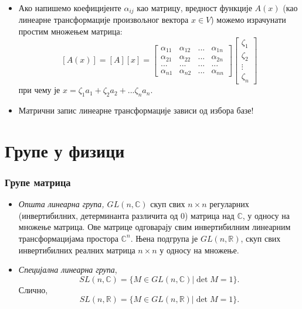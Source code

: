 \documentclass{beamer}
\theoremstyle{plain}
\theoremstyle{definition}
\begin{document}
\begin{frame}
\begin{itemize}
\item Ако напишемо коефицијенте $\alpha_{ij}$ као матрицу, вредност функције $A(x)$ (као линеарне трансформације произвољног вектора $x\in V$) можемо израчунати простим множењем матрица:
$$[A(x)] = [A][x] = \begin{bmatrix}
            \alpha_{11} & \alpha_{12} & ... & \alpha_{1n} \\
            \alpha_{21} & \alpha_{22} & ... & \alpha_{2n} \\
            ... & ... & ... & ... \\
            \alpha_{n1} & \alpha_{n2} & ... & \alpha_{nn}
           \end{bmatrix}
           \begin{bmatrix}
           \zeta_1\\
           \zeta_2\\
           \vdots \\
           \zeta_n
           \end{bmatrix}
$$
при чему је $x = \zeta_1 a_1 + \zeta_2 a_2 + ... \zeta_n a_n$.
\item Матрични запис линеарне трансформације зависи од избора базе!
\end{itemize}
\end{frame}

\section{Групе у физици}
\begin{frame}
\frametitle{Групе матрица}
\begin{itemize}
\item \emph{Општа линеарна група, $GL(n, \mathbb{C})$} скуп свих $n\times n$ регуларних (инвертибилних, детерминанта различита од 0) матрица над $\mathbb{C}$, у односу на множење матрица. Ове матрице одговарају свим инвертибилним линеарним трансформацијама простора $\mathbb{C}^n$. Њена подгрупа је $GL(n, \mathbb{R})$, скуп свих инвертибилних реалних матрица $n\times n$ у односу на множење.
  \item \emph{Специјална линеарна група}, $$SL(n, \mathbb{C}) = \{M\in GL(n, \mathbb{C})|\det M = 1\}.$$ Слично,
  $$SL(n, \mathbb{R}) = \{M\in GL(n, \mathbb{R})|\det M = 1\}.$$
\end{itemize}
\end{frame}
\end{document}
